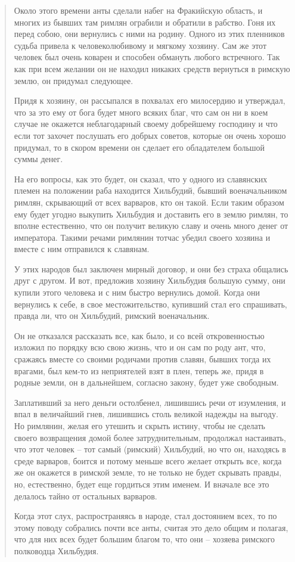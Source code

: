 \begin{quotation}
Около этого времени анты сделали набег на Фракийскую область, и многих из бывших там римлян ограбили и обратили в рабство. Гоня их перед собою, они вернулись с ними на родину. Одного из этих пленников судьба привела к человеколюбивому и мягкому хозяину. Сам же этот человек был очень коварен и способен обмануть любого встречного. Так как при всем желании он не находил никаких средств вернуться в римскую землю, он придумал следующее. 

Придя к хозяину, он рассыпался в похвалах его милосердию и утверждал, что за это ему от бога будет много всяких благ, что сам он ни в коем случае не окажется неблагодарный своему добрейшему господину и что если тот захочет послушать его добрых советов, которые он очень хорошо придумал, то в скором времени он сделает его обладателем большой суммы денег. 

На его вопросы, как это будет, он сказал, что у одного из славянских племен на положении раба находится Хильбудий, бывший военачальником римлян, скрывающий от всех варваров, кто он такой. Если таким образом ему будет угодно выкупить Хильбудия и доставить его в землю римлян, то вполне естественно, что он получит великую славу и очень много денег от императора. Такими речами римлянин тотчас убедил своего хозяина и вместе с ним отправился к славянам.

У этих народов был заключен мирный договор, и они без страха общались друг с другом. И вот, предложив хозяину Хильбудия большую сумму, они купили этого человека и с ним быстро вернулись домой. Когда они вернулись к себе, в свое местожительство, купивший стал его спрашивать, правда ли, что он Хильбудий, римский военачальник. 

Он не отказался рассказать все, как было, и со всей откровенностью изложил по порядку всю свою жизнь, что и он сам по роду ант, что, сражаясь вместе со своими родичами против славян, бывших тогда их врагами, был кем-то из неприятелей взят в плен, теперь же, придя в родные земли, он в дальнейшем, согласно закону, будет уже свободным.

Заплативший за него деньги остолбенел, лишившись речи от изумления, и впал в величайший гнев, лишившись столь великой надежды на выгоду. Но римлянин, желая его утешить и скрыть истину, чтобы не сделать своего возвращения домой более затруднительным, продолжал настаивать, что этот человек – тот самый (римский) Хильбудий, но что он, находясь в среде варваров, боится и потому меньше всего желает открыть все, когда же он окажется в римской земле, то не только не будет скрывать правды, но, естественно, будет еще гордиться этим именем. И вначале все это делалось тайно от остальных варваров.

Когда этот слух, распространяясь в народе, стал достоянием всех, то по этому поводу собрались почти все анты, считая это дело общим и полагая, что для них всех будет большим благом то, что они – хозяева римского полководца Хильбудия.
\end{quotation}

